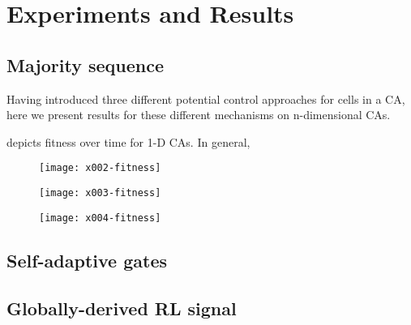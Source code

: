 \section{Experiments and Results}\label{s:results}


\subsection{Majority sequence}

Having introduced three different potential control approaches for cells in a CA, here we present results for these different mechanisms on n-dimensional CAs.

 depicts fitness over time for 1-D CAs.  In general, 

\begin{figure}[htb]
\centering\texttt{[image: x002-fitness]}
\caption{}
\label{f:2-fixed-movement}
\end{figure}

\begin{figure}[htb]
\centering\texttt{[image: x003-fitness]}
\caption{}
\label{f:2-fixed-movement}
\end{figure}

\begin{figure}[htb]
\centering\texttt{[image: x004-fitness]}
\caption{}
\label{f:2-fixed-movement}
\end{figure}




\subsection{Self-adaptive gates}


\subsection{Globally-derived RL signal}

